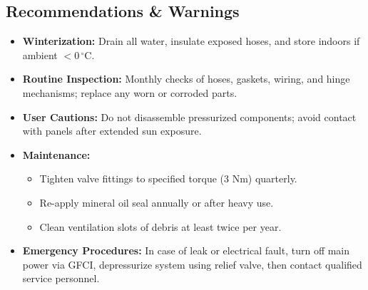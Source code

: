 \documentclass[12pt]{article}
\begin{document}
\subsection{Recommendations \& Warnings}
\begin{itemize}[leftmargin=1.5cm]
  \item \textbf{Winterization:} Drain all water, insulate exposed hoses, and store indoors if ambient $<0\,^\circ\mathrm{C}$.  
  \item \textbf{Routine Inspection:} Monthly checks of hoses, gaskets, wiring, and hinge mechanisms; replace any worn or corroded parts.  
  \item \textbf{User Cautions:} Do not disassemble pressurized components; avoid contact with panels after extended sun exposure.  
  \item \textbf{Maintenance:}
    \begin{itemize}
      \item Tighten valve fittings to specified torque (3 Nm) quarterly.  
      \item Re-apply mineral oil seal annually or after heavy use.  
      \item Clean ventilation slots of debris at least twice per year.  
    \end{itemize}
  \item \textbf{Emergency Procedures:} In case of leak or electrical fault, turn off main power via GFCI, depressurize system using relief valve, then contact qualified service personnel.  
\end{itemize}


\end{document}
